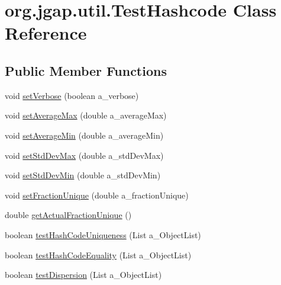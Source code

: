 \hypertarget{classorg_1_1jgap_1_1util_1_1_test_hashcode}{\section{org.\-jgap.\-util.\-Test\-Hashcode Class Reference}
\label{classorg_1_1jgap_1_1util_1_1_test_hashcode}
}
\subsection*{Public Member Functions}
\begin{DoxyCompactItemize}
\item 
void \hyperlink{classorg_1_1jgap_1_1util_1_1_test_hashcode_ae131c5551de0bf40b9225b14922743d7}{set\-Verbose} (boolean a\-\_\-verbose)
\item 
void \hyperlink{classorg_1_1jgap_1_1util_1_1_test_hashcode_aae8175c503c5865df1b053f1a069f0af}{set\-Average\-Max} (double a\-\_\-average\-Max)
\item 
void \hyperlink{classorg_1_1jgap_1_1util_1_1_test_hashcode_a22b485c1780827f6aac105ee0195a894}{set\-Average\-Min} (double a\-\_\-average\-Min)
\item 
void \hyperlink{classorg_1_1jgap_1_1util_1_1_test_hashcode_a9a8fc1bfe0d7798c1ec2bb2953d8dc61}{set\-Std\-Dev\-Max} (double a\-\_\-std\-Dev\-Max)
\item 
void \hyperlink{classorg_1_1jgap_1_1util_1_1_test_hashcode_a55f2e3c33a14b3d618fa4639f52532e5}{set\-Std\-Dev\-Min} (double a\-\_\-std\-Dev\-Min)
\item 
void \hyperlink{classorg_1_1jgap_1_1util_1_1_test_hashcode_a183ef9ad688b366f44bdc2c4d8fb4afe}{set\-Fraction\-Unique} (double a\-\_\-fraction\-Unique)
\item 
double \hyperlink{classorg_1_1jgap_1_1util_1_1_test_hashcode_aba4717a5deb8ccff616483c261234097}{get\-Actual\-Fraction\-Unique} ()
\item 
boolean \hyperlink{classorg_1_1jgap_1_1util_1_1_test_hashcode_a8b64668c1d3ab567efb816ac2ed597e9}{test\-Hash\-Code\-Uniqueness} (List a\-\_\-\-Object\-List)
\item 
boolean \hyperlink{classorg_1_1jgap_1_1util_1_1_test_hashcode_a6b0812f682b3941831c04a842b05c4fb}{test\-Hash\-Code\-Equality} (List a\-\_\-\-Object\-List)
\item 
boolean \hyperlink{classorg_1_1jgap_1_1util_1_1_test_hashcode_a08e541143a78fdf8902cedac17e1f65d}{test\-Dispersion} (List a\-\_\-\-Object\-List)
\end{DoxyCompactItemize}
